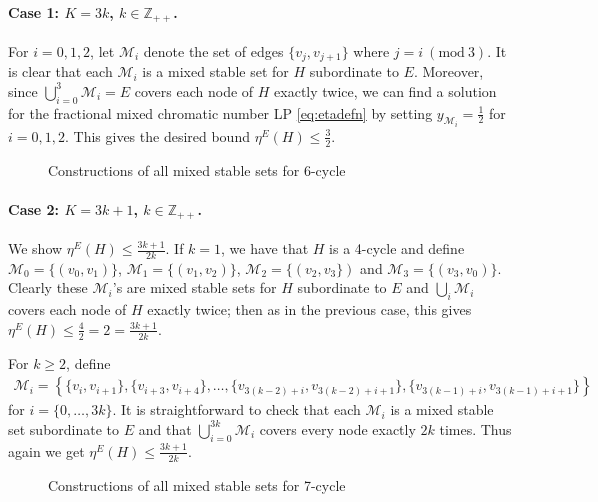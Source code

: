 \documentclass[smallextended]{svjour3}
\begin{document}
{}

\paragraph{Case 1: $K = 3k$, $k \in \mathbb{Z}_{++}$.} For $i = 0,1,2$, let ${\mathcal{M}}_i$ denote the set of edges $\{v_j, v_{j+1}\}$ where $j = i {\ (\text{mod}\ {3})}$. It is clear that each ${\mathcal{M}}_i$ is a mixed stable set for $H$ subordinate to $E$. Moreover, since $\bigcup_{i = 0}^3 {\mathcal{M}}_i = E$ covers each node of $H$ exactly twice, we can find a solution for the fractional mixed chromatic number LP \eqref{eq:etadefn} by setting $y_{{\mathcal{M}}_i} = \frac{1}{2}$ for $i=0,1,2$. This gives the desired bound $\eta^E(H) \le \frac{3}{2}$.

\begin{figure}[h!]
	\centering    
	\caption{Constructions of all mixed stable sets for 6-cycle}
	\label{fig6c}
\end{figure}
\paragraph{Case 2: $K = 3k + 1$, $k \in \mathbb{Z}_{++}$.} We show $\eta^E(H) \le \frac{3k + 1}{2k}$. If $k = 1$, we have that $H$ is a 4-cycle and define ${\mathcal{M}}_0 = \{(v_0,v_1)\}$, ${\mathcal{M}}_1 = \{(v_1, v_2)\}$, ${\mathcal{M}}_2 = \{(v_2, v_3\})$ and ${\mathcal{M}}_3 = \{(v_3, v_0)\}$. Clearly these ${\mathcal{M}}_i$'s are mixed stable sets for $H$ subordinate to $E$ and $\bigcup_i {\mathcal{M}}_i$ covers each node of $H$ exactly twice; then as in the previous case, this gives $\eta^E(H) \le \frac{4}{2} = 2 = \frac{3k + 1}{2k}$.

	For $k \ge 2$, define
\begin{eqnarray*}
\mathcal{M}_{i} =  \left\{ \{v_{i}, v_{i+1}\}, \{v_{i + 3}, v_{i + 4}\}, \ldots, \{v_{3(k-2)+i}, v_{3(k-2)+i + 1}\}, \{v_{3(k-1)+i}, v_{3(k-1)+i + 1}\}\right\}
\end{eqnarray*}
for $i = \{0, \dots, 3k\}$. 
It is straightforward to check that each $\mathcal{M}_i$ is a mixed stable set subordinate to $E$ and that $\bigcup_{i = 0}^{3k} \mathcal{M}_i$ covers every node exactly $2k$ times. Thus again we get $\eta^E(H) \le \frac{3k + 1}{2k}$.

\begin{figure}[h!]
	\centering    
	\caption{Constructions of all mixed stable sets for 7-cycle}
	\label{fig7c}
\end{figure}
\end{document}
